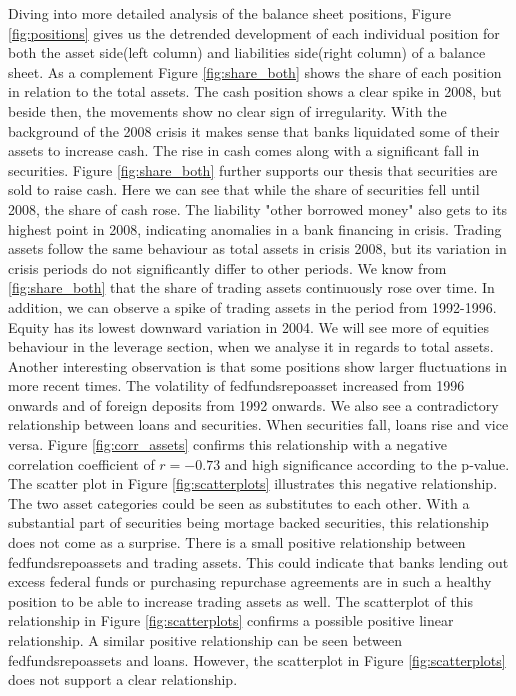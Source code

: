 \documentclass[12pt, a4paper]{article} %
\begin{document}
Diving into more detailed analysis of the balance sheet positions, Figure \ref{fig:positions} gives us the detrended development of each individual position for both the asset side(left column) and liabilities side(right column) of a balance sheet. As a complement Figure \ref{fig:share_both} shows the share of each position in relation to the total assets. 
The cash position shows a clear spike in 2008, but beside then, the movements show no clear sign of irregularity. With the background of the 2008 crisis it makes sense that banks liquidated some of their assets to increase cash. The rise in cash comes along with a significant fall in securities. Figure \ref{fig:share_both} further supports our thesis that securities are sold to raise cash. Here we can see that while the share of securities fell until 2008, the share of cash rose.
The liability "other borrowed money" also gets to its highest point in 2008, indicating anomalies in a bank financing in crisis.
Trading assets follow the same behaviour as total assets in crisis 2008, but its variation in crisis periods do not significantly differ to other periods. We know from \ref{fig:share_both} that the share of trading assets continuously rose over time. In addition, we can observe a spike of trading assets in the period from 1992-1996.
Equity has its lowest downward variation in 2004. We will see more of equities behaviour in the leverage section, when we analyse it in regards to total assets.
Another interesting observation is that some positions show larger fluctuations in more recent times. The volatility of fedfundsrepoasset increased from 1996 onwards and of foreign deposits from 1992 onwards. 
We also see a contradictory relationship between loans and securities. When securities fall, loans rise and vice versa. Figure \ref{fig:corr_assets} confirms this relationship with a negative correlation coefficient of $r=-0.73$ and high significance according to the p-value. The scatter plot in Figure \ref{fig:scatterplots} illustrates this negative relationship. The two asset categories could be seen as substitutes to each other. With a substantial part of securities being mortage backed securities, this relationship does not come as a surprise. 
There is a small positive relationship between fedfundsrepoassets and trading assets. This could indicate that banks lending out excess federal funds or purchasing repurchase agreements are in such a healthy position to be able to increase trading assets as well. The scatterplot of this relationship in Figure \ref{fig:scatterplots} confirms a possible positive linear relationship. A similar positive relationship can be seen between fedfundsrepoassets and loans. However, the scatterplot in Figure \ref{fig:scatterplots} does not support a clear relationship.
\end{document}
